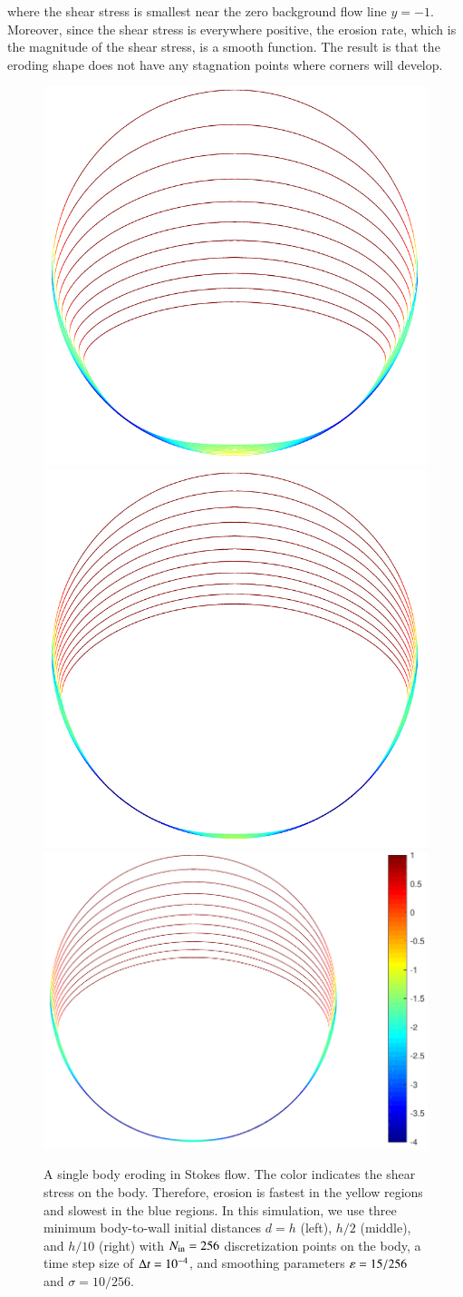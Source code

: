 \documentclass[preprint, 10pt]{elsarticle}
\begin{document}
where the shear stress is smallest near the zero background flow line
$y=-1$.  Moreover, since the shear stress is everywhere positive, the
erosion rate, which is the magnitude of the shear stress, is a smooth
function.  The result is that the eroding shape does not have any
stagnation points where corners will develop.

\begin{figure}[htbp]
\begin{center}
\includegraphics[width = 0.30 \textwidth]{./figs/1b_0d4r1h_shear}
\includegraphics[width = 0.30 \textwidth]{./figs/1b_0d4r0d5h_shear}
\includegraphics[width = 0.38 \textwidth]{./figs/1b_0d4r0d1h_shear}
\caption{\label{fig:NearWall} 
  A single body eroding in Stokes flow. The color indicates the shear
  stress on the body. Therefore, erosion is fastest in the yellow
  regions and slowest in the blue regions.  In this simulation, we use
  three minimum body-to-wall initial distances $d=h$ (left), $h/2$
  (middle), and $h/10$ (right) with $N_{\mathrm{in}} = 256$ discretization points
  on the body, a time step size of $\Delta t=10^{-4}$, and smoothing
  parameters $\varepsilon = 15/256$ and $\sigma=10/256$.}
\end{center}
\end{figure}
\end{document}
